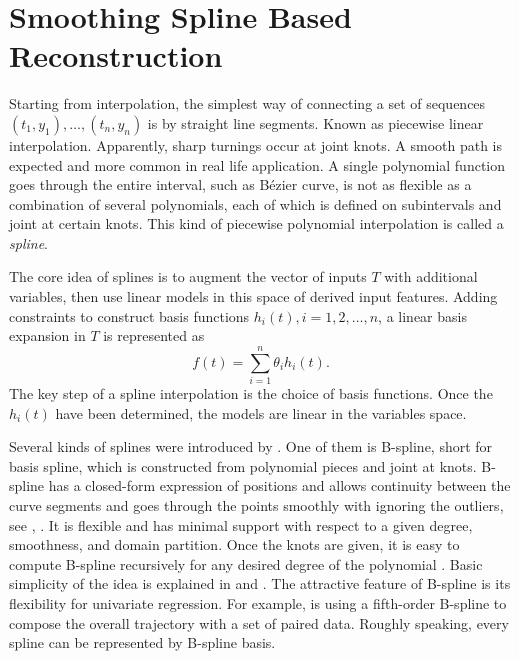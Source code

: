 \section{Smoothing Spline Based Reconstruction}


Starting from interpolation, the simplest way of connecting a set of sequences $(t_1,y_1),\ldots, (t_n,y_n)$ is by straight line segments. Known as piecewise linear interpolation. Apparently, sharp turnings occur at joint knots. A smooth path is expected and more common in real life application. A single polynomial function goes through the entire interval, such as B\'ezier curve, is not as flexible as a combination of several polynomials, each of which is defined on subintervals and joint at certain knots. This kind of piecewise polynomial interpolation is called a \textit{spline}. 

The core idea of splines is to augment the vector of inputs $T$ with additional variables, then use linear models in this space of derived input features. Adding constraints to construct basis functions $h_i(t), i = 1, 2,\ldots, n$, a linear basis expansion in $T$ is represented as
\begin{equation*}
f(t)=\sum_{i=1}^n \theta_i h_i(t).
\end{equation*}
The key step of a spline interpolation is the choice of basis functions. Once the $h_i(t)$ have been determined, the models are linear in the variables space. 

Several kinds of splines were introduced by \cite{esl2009}. One of them is B-spline, short for basis spline, which is constructed from polynomial pieces and joint at knots. B-spline has a closed-form expression of positions and allows continuity between the curve segments and goes through the points smoothly with ignoring the outliers, see \eg \cite{komoriya1989trajectory}, \cite{ben2004geometric}. It is flexible and has minimal support with respect to a given degree, smoothness, and domain partition. Once the knots are given, it is easy to compute B-spline recursively for any desired degree of the polynomial \cite{de1978practical} \cite{cox1982practical}. Basic simplicity of the idea is explained in \cite{dierckx1995curve} and \cite{eilers1996flexible}. The attractive feature of B-spline is its flexibility for univariate regression. For example,  \cite{gasparetto2007new} is using a fifth-order B-spline to compose the overall trajectory with a set of paired data. Roughly speaking, every spline can be represented by B-spline basis. 


